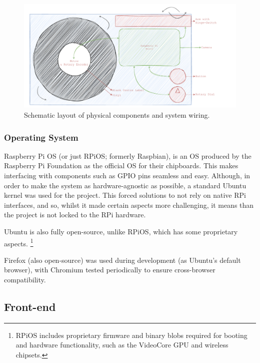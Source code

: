                 \begin{figure}[h]
                    \centering
                    \includegraphics[width=0.95\linewidth]{images/SketchPhys.pdf}
                    \caption{Schematic layout of physical components and system wiring.}
                    \label{fig:sketchPhys}
                \end{figure}
    
            \subsubsection{Operating System}
    
                Raspberry Pi OS (or just RPiOS; formerly Raspbian), is an OS produced by the Raspberry Pi Foundation as the official OS for their chipboards. This makes interfacing with components such as GPIO pins seamless and easy. Although, in order to make the system as hardware-agnostic as possible, a standard Ubuntu kernel was used for the project. This forced solutions to not rely on native RPi interfaces, and so, whilst it made certain aspects more challenging, it means than the project is not locked to the RPi hardware.
    
                Ubuntu is also fully open-source, unlike RPiOS, which has some proprietary aspects. \footnote{RPiOS includes proprietary firmware and binary blobs required for booting and hardware functionality, such as the VideoCore GPU and wireless chipsets.}
    
    
                Firefox (also open-source) was used during development (as Ubuntu's default browser), with Chromium tested periodically to ensure cross-browser compatibility.
                
        
        \subsection{Front-end}
